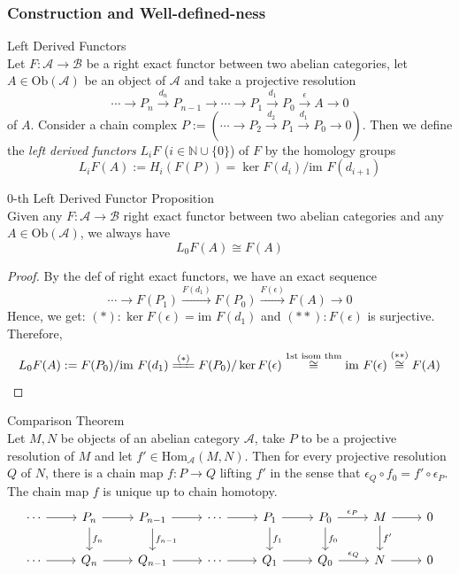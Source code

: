 \subsubsection{Construction and Well-defined-ness}

\begin{definition}{Left Derived Functors}\\
Let $F:\mathcal{A} \to \mathcal{B}$ be a right exact functor between two abelian categories, let $A\in \text{Ob} (\mathcal{A})$ be an object of $\mathcal{A}$ and take a projective resolution 
\[
\cdots \to P_n \xrightarrow{d_n} P_{n-1} \to \cdots \to P_1 \xrightarrow{d_1} P_0 \xrightarrow{\epsilon} A\to 0
\]
of $A$. Consider a chain complex $P:= (\cdots \to P_2 \xrightarrow{d_2} P_1 \xrightarrow{d_1} P_0\to0)$. Then we define the \textit{left derived functors} $L_iF $ ($i\in \mathbb{N} \cup \{0\}$) of $F$ by the homology groups
\[
L_iF(A):= H_i(F(P))= \ker F(d_i)/ \text{im }F(d_{i+1})
\]
\end{definition}

\begin{proposition}{$0$-th Left Derived Functor Proposition}\\
Given any $F: \mathcal{A} \to \mathcal{B}$ right exact functor between two abelian categories and any $A\in \text{Ob} (\mathcal{A})$, we always have
\[
L_0F(A) \cong F(A)
\]
\end{proposition}

\begin{proof}
    By the def of right exact functors, we have an exact sequence
    \[
    \cdots \to F(P_1) \xrightarrow{F(d_1)} F(P_0) \xrightarrow{F(\epsilon)} F(A)\to 0
    \]
    Hence, we get: $(*):\ker F(\epsilon)= \text{im }F(d_1)$ and $(**): F(\epsilon)$ is surjective. Therefore,
    \[
    L_0F(A) := F(P_0)/ \text{im } F(d_1) \xlongequal{(*)} F(P_0)/ \ker F(\epsilon) \overset{\text{1st isom thm}}{\cong} \text{im }F(\epsilon) \overset{(**)}{\cong} F(A)
    \]
\end{proof}

\begin{lemma}{Comparison Theorem}\\
Let $M,N$ be objects of an abelian category $\mathcal{A}$, take $P$ to be a projective resolution of $M$ and let $f' \in \text{Hom}_\mathcal{A} (M,N)$. Then for every projective resolution $Q$ of $N$, there is a chain map $f:P \to Q$ lifting $f'$ in the sense that $\epsilon_Q \circ f_0= f'\circ \epsilon_P$. The chain map $f$ is unique up to chain homotopy.
\[
\begin{tikzcd}
    \cdots \arrow[r] &P_n \arrow[r] \arrow[d, "f_n"] &P_{n-1} \arrow[r] \arrow[d, "f_{n-1}"] &\cdots \arrow[r] &P_1 \arrow[r] \arrow[d, "f_1"]& P_0 \arrow[r, "\epsilon_P"] \arrow[d, "f_0"]&M \arrow[r] \arrow[d, "f'"] &0\\
    \cdots \arrow[r] &Q_n\arrow[r]& Q_{n-1}\arrow[r] &\cdots \arrow[r] &Q_1\arrow[r] &Q_0\arrow[r, "\epsilon_Q"] &N\arrow[r] &0
\end{tikzcd}
\]
\end{lemma}

